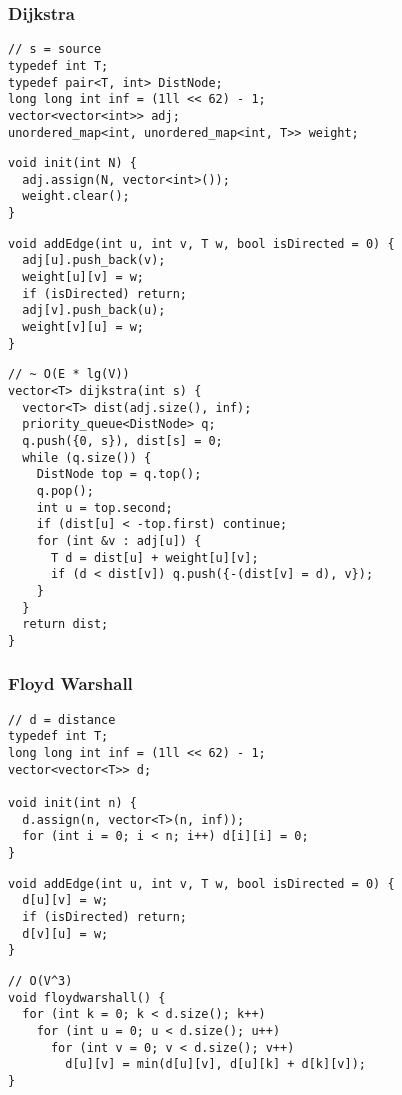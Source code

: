 \documentclass[twoside]{article}
\begin{document}
\begin{multicols*}{2}
\subsubsection*{Dijkstra}
\begin{verbatim}
// s = source
typedef int T;
typedef pair<T, int> DistNode;
long long int inf = (1ll << 62) - 1;
vector<vector<int>> adj;
unordered_map<int, unordered_map<int, T>> weight;
\end{verbatim}
\vspace{-12pt}
\begin{verbatim}
void init(int N) {
  adj.assign(N, vector<int>());
  weight.clear();
}
\end{verbatim}
\vspace{-12pt}
\begin{verbatim}
void addEdge(int u, int v, T w, bool isDirected = 0) {
  adj[u].push_back(v);
  weight[u][v] = w;
  if (isDirected) return;
  adj[v].push_back(u);
  weight[v][u] = w;
}
\end{verbatim}
\vspace{-12pt}
\begin{verbatim}
// ~ O(E * lg(V))
vector<T> dijkstra(int s) {
  vector<T> dist(adj.size(), inf);
  priority_queue<DistNode> q;
  q.push({0, s}), dist[s] = 0;
  while (q.size()) {
    DistNode top = q.top();
    q.pop();
    int u = top.second;
    if (dist[u] < -top.first) continue;
    for (int &v : adj[u]) {
      T d = dist[u] + weight[u][v];
      if (d < dist[v]) q.push({-(dist[v] = d), v});
    }
  }
  return dist;
}
\end{verbatim}

\subsubsectionfont{\large\bfseries\sffamily\underline}
\subsubsection*{Floyd Warshall}
\begin{verbatim}
// d = distance
typedef int T;
long long int inf = (1ll << 62) - 1;
vector<vector<T>> d;

void init(int n) {
  d.assign(n, vector<T>(n, inf));
  for (int i = 0; i < n; i++) d[i][i] = 0;
}
\end{verbatim}
\vspace{-12pt}
\begin{verbatim}
void addEdge(int u, int v, T w, bool isDirected = 0) {
  d[u][v] = w;
  if (isDirected) return;
  d[v][u] = w;
}
\end{verbatim}
\vspace{-12pt}
\begin{verbatim}
// O(V^3)
void floydwarshall() {
  for (int k = 0; k < d.size(); k++)
    for (int u = 0; u < d.size(); u++)
      for (int v = 0; v < d.size(); v++)
        d[u][v] = min(d[u][v], d[u][k] + d[k][v]);
}
\end{verbatim}


\end{multicols*}
\end{document}
